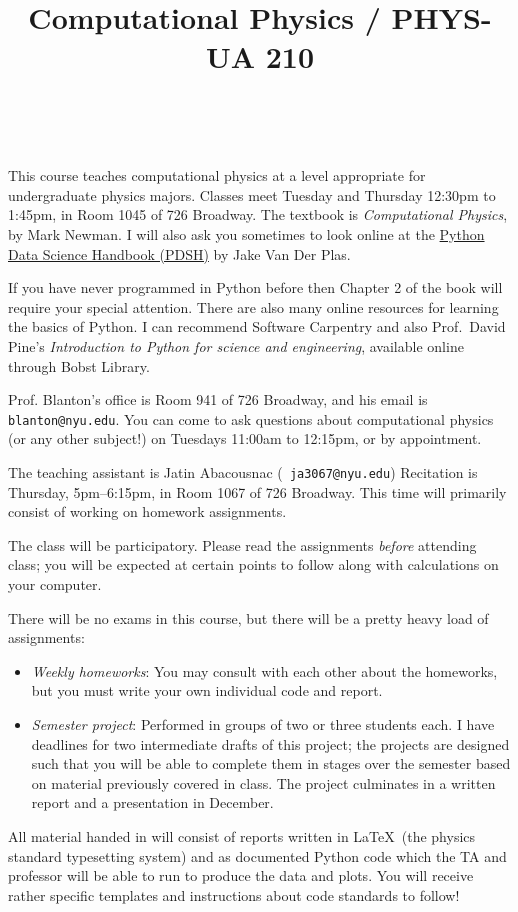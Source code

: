 \documentclass[11pt, preprint]{aastex}
\begin{document}
\title{\bf Computational Physics / PHYS-UA 210}
~
~

\noindent This course teaches computational physics at a level
appropriate for undergraduate physics majors.  Classes meet Tuesday
and Thursday 12:30pm to 1:45pm, in Room 1045 of 726 Broadway.  The
textbook is {\it Computational Physics}, by Mark Newman. I will also
ask you sometimes to look online at the
\href{https://jakevdp.github.io/PythonDataScienceHandbook/}{Python
  Data Science Handbook (PDSH)} by Jake Van Der Plas.

\noindent If you have never programmed in Python before then Chapter 2
of the book will require your special attention. There are also many
online resources for learning the basics of Python. I can recommend
Software Carpentry and also Prof.~David Pine's {\it Introduction to
  Python for science and engineering}, available online through Bobst
Library.

\noindent Prof. Blanton's office is Room 941 of 726 Broadway, and his
email is {\tt blanton@nyu.edu}. You can come to ask questions about
computational physics (or any other subject!) on Tuesdays 11:00am to
12:15pm, or by appointment.

\noindent The teaching assistant is Jatin Abacousnac ({\tt
  ja3067@nyu.edu}) Recitation is Thursday, 5pm--6:15pm, in Room 1067
of 726 Broadway. This time will primarily consist of working on
homework assignments.

\noindent The class will be participatory. Please read the assignments
          {\it before} attending class; you will be expected at
          certain points to follow along with calculations on your
          computer.

\noindent There will be no exams in this course, but there will be a
pretty heavy load of assignments:
\begin{itemize}
\item {\it Weekly homeworks}: You may consult with each other about
  the homeworks, but you must write your own individual code and
  report.
\item {\it Semester project}: Performed in groups of two or three
  students each. I have deadlines for two intermediate drafts of this
  project; the projects are designed such that you will be able to
  complete them in stages over the semester based on material
  previously covered in class. The project culminates in a written
  report and a presentation in December.
\end{itemize}
All material handed in will consist of reports written in \LaTeX\ (the
physics standard typesetting system) and as documented Python code
which the TA and professor will be able to run to produce the data and
plots. You will receive rather specific templates and instructions
about code standards to follow!
\end{document}

